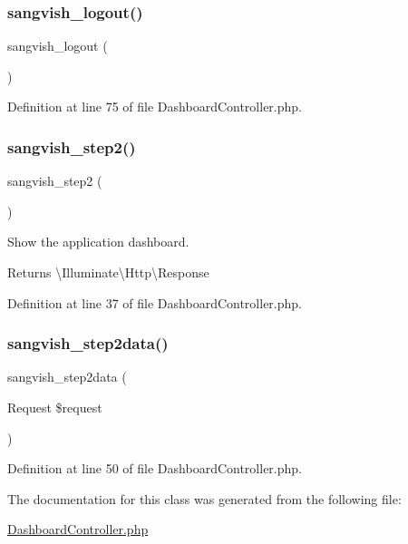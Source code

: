 \subsubsection{\texorpdfstring{sangvish\_logout()}{sangvish\_logout()}}
{\footnotesize\ttfamily sangvish\+\_\+logout (\begin{DoxyParamCaption}{ }\end{DoxyParamCaption})}



Definition at line 75 of file Dashboard\+Controller.\+php.

\mbox{\label{class_responsive_1_1_http_1_1_controllers_1_1_dashboard_controller_a1fb1d3f3ee65c2682c3bcd488fe8b6f1}} 
\subsubsection{\texorpdfstring{sangvish\_step2()}{sangvish\_step2()}}
{\footnotesize\ttfamily sangvish\+\_\+step2 (\begin{DoxyParamCaption}{ }\end{DoxyParamCaption})}

Show the application dashboard.

\begin{DoxyReturn}{Returns}
\textbackslash{}\+Illuminate\textbackslash{}\+Http\textbackslash{}\+Response 
\end{DoxyReturn}


Definition at line 37 of file Dashboard\+Controller.\+php.

\mbox{\label{class_responsive_1_1_http_1_1_controllers_1_1_dashboard_controller_a957f66d97649f43f487932b53859d3fd}} 
\subsubsection{\texorpdfstring{sangvish\_step2data()}{sangvish\_step2data()}}
{\footnotesize\ttfamily sangvish\+\_\+step2data (\begin{DoxyParamCaption}\item[{Request}]{\$request }\end{DoxyParamCaption})\hspace{0.3cm}{\ttfamily [protected]}}



Definition at line 50 of file Dashboard\+Controller.\+php.



The documentation for this class was generated from the following file\+:\begin{DoxyCompactItemize}
\item 
\mbox{\hyperlink{_dashboard_controller_8php}{Dashboard\+Controller.\+php}}\end{DoxyCompactItemize}
